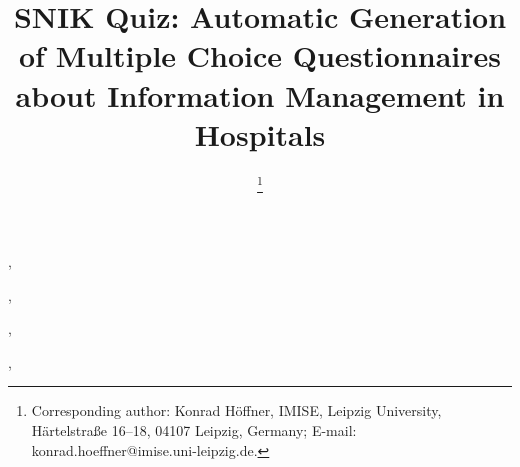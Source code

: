 \documentclass{IOS-Book-Article}     %
\def\hb{\hbox to 11.5 cm{}}
\begin{document}
\pagestyle{headings}
\def\thepage{}

\begin{frontmatter}              %


\title{SNIK Quiz: Automatic Generation of Multiple Choice Questionnaires about Information Management in Hospitals}

\markboth{}{May 2022\hb}

\author[A]{ %
\thanks{Corresponding author: Konrad Höffner, IMISE, Leipzig University,
Härtelstraße 16--18, 04107 Leipzig, Germany; E-mail: konrad.hoeffner@imise.uni-leipzig.de.}},
\author[A]{ },
\author[A]{ },
\author[A]{ },
\author[A]{ }
\address[A]{IMISE, Leipzig University, Germany}

\begin{abstract}


\end{abstract}
\end{frontmatter}
\end{document}
